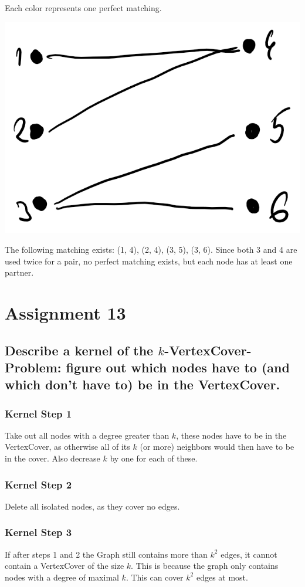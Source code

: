 \documentclass[runningheads]{llncs}
\begin{document}
Each color represents one perfect matching.

\includegraphics[scale=0.5]{./resources/graph_4}

The following matching exists: (1, 4), (2, 4), (3, 5), (3, 6). Since both 3 and 4 are used twice for a pair, no perfect matching exists, but each node has at least one partner.

\section*{Assignment 13}

\subsection*{Describe a kernel of the $k$-VertexCover-Problem: figure out which nodes have to (and which don’t have to) be in the VertexCover.}

\subsubsection*{Kernel Step 1} Take out all nodes with a degree greater than $k$, these nodes have to be in the VertexCover, as otherwise all of its $k$ (or more) neighbors would then have to be in the cover. Also decrease $k$ by one for each of these.
\subsubsection*{Kernel Step 2} Delete all isolated nodes, as they cover no edges.
\subsubsection*{Kernel Step 3} If after steps 1 and 2 the Graph still contains more than $k^2$ edges, it cannot contain a VertexCover of the size $k$. This is because the graph only contains nodes with a degree of maximal $k$. This can cover $k^2$ edges at most.
\end{document}
